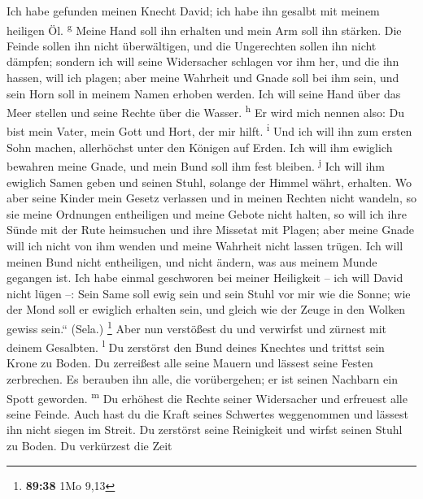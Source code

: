  Ich habe gefunden meinen Knecht David; ich habe ihn
gesalbt mit meinem heiligen Öl. \textsuperscript{g} 
Meine Hand soll ihn erhalten und mein Arm soll ihn stärken.
 Die Feinde sollen ihn nicht überwältigen, und die
Ungerechten sollen ihn nicht dämpfen;  sondern ich will
seine Widersacher schlagen vor ihm her, und die ihn hassen, will ich
plagen;  aber meine Wahrheit und Gnade soll bei ihm sein,
und sein Horn soll in meinem Namen erhoben werden.  Ich
will seine Hand über das Meer stellen und seine Rechte über die Wasser.
\textsuperscript{h}  Er wird mich nennen also: Du bist
mein Vater, mein Gott und Hort, der mir hilft. \textsuperscript{i}
 Und ich will ihn zum ersten Sohn machen, allerhöchst
unter den Königen auf Erden.  Ich will ihm ewiglich
bewahren meine Gnade, und mein Bund soll ihm fest bleiben.
\textsuperscript{j}  Ich will ihm ewiglich Samen geben
und seinen Stuhl, solange der Himmel währt, erhalten.  Wo
aber seine Kinder mein Gesetz verlassen und in meinen Rechten nicht
wandeln,  so sie meine Ordnungen entheiligen und meine
Gebote nicht halten,  so will ich ihre Sünde mit der Rute
heimsuchen und ihre Missetat mit Plagen;  aber meine
Gnade will ich nicht von ihm wenden und meine Wahrheit nicht lassen
trügen.  Ich will meinen Bund nicht entheiligen, und
nicht ändern, was aus meinem Munde gegangen ist.  Ich
habe einmal geschworen bei meiner Heiligkeit -- ich will David nicht
lügen --:  Sein Same soll ewig sein und sein Stuhl vor
mir wie die Sonne;  wie der Mond soll er ewiglich
erhalten sein, und gleich wie der Zeuge in den Wolken gewiss sein.``
(Sela.) \footnote{\textbf{89:38} 1Mo 9,13}  Aber nun
verstößest du und verwirfst und zürnest mit deinem Gesalbten.
\textsuperscript{l}  Du zerstörst den Bund deines
Knechtes und trittst sein Krone zu Boden.  Du zerreißest
alle seine Mauern und lässest seine Festen zerbrechen. 
Es berauben ihn alle, die vorübergehen; er ist seinen Nachbarn ein Spott
geworden. \textsuperscript{m}  Du erhöhest die Rechte
seiner Widersacher und erfreuest alle seine Feinde.  Auch
hast du die Kraft seines Schwertes weggenommen und lässest ihn nicht
siegen im Streit.  Du zerstörst seine Reinigkeit und
wirfst seinen Stuhl zu Boden.  Du verkürzest die Zeit

